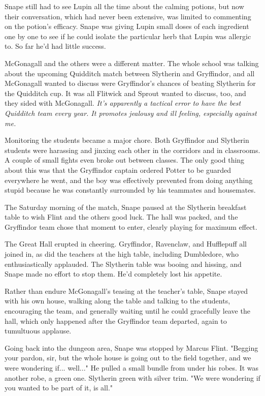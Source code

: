 \documentclass[a4paper,11pt]{article}
\begin{document}
Snape still had to see Lupin all the time about the calming potions, but now their conversation, which had never been extensive, was limited to commenting on the potion's efficacy. Snape was giving Lupin small doses of each ingredient one by one to see if he could isolate the particular herb that Lupin was allergic to. So far he'd had little success.

McGonagall and the others were a different matter. The whole school was talking about the upcoming Quidditch match between Slytherin and Gryffindor, and all McGonagall wanted to discuss were Gryffindor's chances of beating Slytherin for the Quidditch cup. It was all Flitwick and Sprout wanted to discuss, too, and they sided with McGonagall. \emph{It's apparently a tactical error to have the best Quidditch team every year. It promotes jealousy and ill feeling, especially against me.}

Monitoring the students became a major chore. Both Gryffindor and Slytherin students were harassing and jinxing each other in the corridors and in classrooms. A couple of small fights even broke out between classes. The only good thing about this was that the Gryffindor captain ordered Potter to be guarded everywhere he went, and the boy was effectively prevented from doing anything stupid because he was constantly surrounded by his teammates and housemates.

The Saturday morning of the match, Snape paused at the Slytherin breakfast table to wish Flint and the others good luck. The hall was packed, and the Gryffindor team chose that moment to enter, clearly playing for maximum effect.

The Great Hall erupted in cheering. Gryffindor, Ravenclaw, and Hufflepuff all joined in, as did the teachers at the high table, including Dumbledore, who enthusiastically applauded. The Slytherin table was booing and hissing, and Snape made no effort to stop them. He'd completely lost his appetite.

Rather than endure McGonagall's teasing at the teacher's table, Snape stayed with his own house, walking along the table and talking to the students, encouraging the team, and generally waiting until he could gracefully leave the hall, which only happened after the Gryffindor team departed, again to tumultuous applause.

Going back into the dungeon area, Snape was stopped by Marcus Flint. "Begging your pardon, sir, but the whole house is going out to the field together, and we were wondering if... well..." He pulled a small bundle from under his robes. It was another robe, a green one. Slytherin green with silver trim. "We were wondering if you wanted to be part of it, is all."
\end{document}
